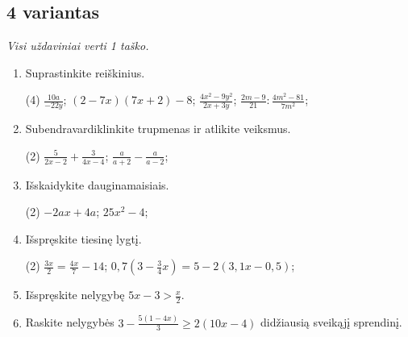 \documentclass[a4paper]{article}
\begin{document}
\vspace*{12mm}

\subsection*{4 variantas}

\textit{Visi uždaviniai verti 1 taško.}

\begin{enumerate}
      \item Suprastinkite reiškinius.
            \begin{tasks}[item-format={\normalfont}, after-item-skip=2mm](4)
                  \task $\frac{10a}{-22y}$;
                  \task $(2-7x)(7x+2)-8$;
                  \task $\frac{4x^2-9y^2}{2x+3y}$;
                  \task $\frac{2m-9}{21}:\frac{4m^2-81}{7m^2}$;
            \end{tasks}

      \item Subendravardiklinkite trupmenas ir atlikite veiksmus.
            \begin{tasks}[item-format={\normalfont}, after-item-skip=2mm](2)
                  \task $\frac{5}{2x-2}+\frac{3}{4x-4}$;
                  \task $\frac{a}{a+2}-\frac{a}{a-2}$;
            \end{tasks}

      \item Išskaidykite dauginamaisiais.
            \begin{tasks}[item-format={\normalfont}, after-item-skip=2mm](2)
                  \task $-2ax+4a$;
                  \task $25x^2-4$;
            \end{tasks}

      \item Išspręskite tiesinę lygtį.
            \begin{tasks}[item-format={\normalfont}, after-item-skip=2mm](2)
                  \task $\frac{3x}{2}=\frac{4x}{7}-14$;
                  \task $0,7(3-\frac{3}{4}x)=5-2(3,1x-0,5)$;
            \end{tasks}

      \item Išspręskite nelygybę $5x-3>\frac{x}{2}$.
      \item Raskite nelygybės $3-\frac{5(1-4x)}{3}\geq2(10x-4)$ didžiausią sveikąjį sprendinį.
\end{enumerate}

\vspace*{12mm}
\end{document}
